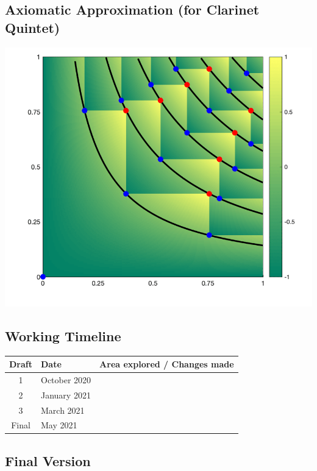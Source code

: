\documentclass{article}
\begin{document}
\begin{center}
\vspace*{\fill}
\LARGE
    \section{Axiomatic Approximation (for Clarinet Quintet)}
    \includegraphics[width=\textwidth]{approximation.png}
\vspace*{\fill}
\end{center}

\newpage

\subsection{Working Timeline}
\begin{center}
	\def\arraystretch{1.5}
\begin{tabular}{|c|l|l|}
	\hline
	Draft&Date&Area explored / Changes made\\
	\hline
	1&October 2020&\\
	\hline
	2&January 2021&\\
	\hline
	3&March 2021&\\
	\hline
	Final&May 2021&\\
	\hline
\end{tabular}
\end{center}

\subsection{Final Version}

\end{document}
